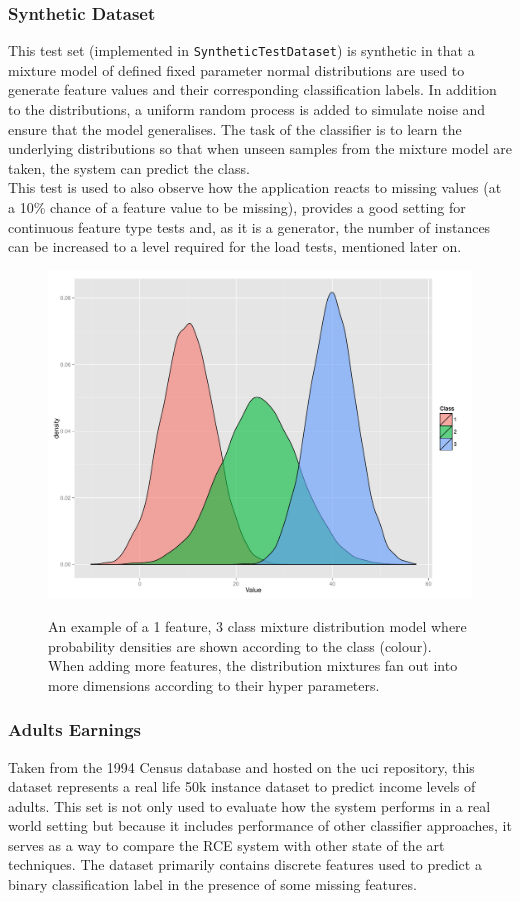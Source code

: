 \documentclass[a4paper,11pt]{scrreprt}
\begin{document}
\subsubsection{Synthetic Dataset}
This test set (implemented in \verb|SyntheticTestDataset|) is synthetic in that a mixture model of defined fixed parameter normal distributions are used to generate feature values and their corresponding classification labels. In addition to the distributions, a uniform random process is added to simulate noise and ensure that the model generalises. The task of the classifier is to learn the underlying distributions so that when unseen samples from the mixture model are taken, the system can predict the class.\\ This test is used to also observe how the application reacts to missing values (at a 10\% chance of a feature value to be missing), provides a good setting for continuous feature type tests and, as it is a generator, the number of instances can be increased to a level required for the load tests, mentioned later on.
\begin{figure}[h!]
\centering
\caption{An example of a 1 feature, 3 class mixture distribution model where probability densities are shown according to the class (colour). When adding more features, the distribution mixtures fan out into more dimensions according to their hyper parameters.}
\includegraphics[scale=0.35, trim=0 0 0 0, clip=true] {synthetic-class-distributions.pdf}
\label{fig:indexes}
\end{figure}
\subsubsection{Adults Earnings} 
Taken from the 1994 Census database and hosted on the \acrshort{uci} repository, this dataset represents a real life 50k instance dataset to predict income levels of adults. This set is not only used to evaluate how the system performs in a real world setting but because it includes performance of other classifier approaches, it serves as a way to compare the RCE system with other state of the art techniques. The dataset primarily contains discrete features used to predict a binary classification label in the presence of some missing features.
\end{document}
